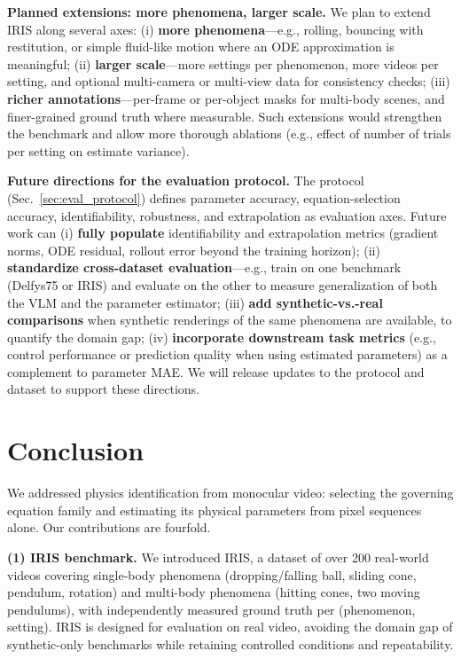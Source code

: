 \textbf{Planned extensions: more phenomena, larger scale.} We plan to extend IRIS along several axes: (i) \textbf{more phenomena}—e.g., rolling, bouncing with restitution, or simple fluid-like motion where an ODE approximation is meaningful; (ii) \textbf{larger scale}—more settings per phenomenon, more videos per setting, and optional multi-camera or multi-view data for consistency checks; (iii) \textbf{richer annotations}—per-frame or per-object masks for multi-body scenes, and finer-grained ground truth where measurable. Such extensions would strengthen the benchmark and allow more thorough ablations (e.g., effect of number of trials per setting on estimate variance).

\textbf{Future directions for the evaluation protocol.} The protocol (Sec.~\ref{sec:eval_protocol}) defines parameter accuracy, equation-selection accuracy, identifiability, robustness, and extrapolation as evaluation axes. Future work can (i) \textbf{fully populate} identifiability and extrapolation metrics (gradient norms, ODE residual, rollout error beyond the training horizon); (ii) \textbf{standardize cross-dataset evaluation}—e.g., train on one benchmark (Delfys75 or IRIS) and evaluate on the other to measure generalization of both the VLM and the parameter estimator; (iii) \textbf{add synthetic-vs.-real comparisons} when synthetic renderings of the same phenomena are available, to quantify the domain gap; (iv) \textbf{incorporate downstream task metrics} (e.g., control performance or prediction quality when using estimated parameters) as a complement to parameter MAE. We will release updates to the protocol and dataset to support these directions.


\section{Conclusion}
\label{sec:conclusion}

We addressed physics identification from monocular video: selecting the governing equation family and estimating its physical parameters from pixel sequences alone. Our contributions are fourfold.

\textbf{(1) IRIS benchmark.} We introduced IRIS, a dataset of over 200 real-world videos covering single-body phenomena (dropping/falling ball, sliding cone, pendulum, rotation) and multi-body phenomena (hitting cones, two moving pendulums), with independently measured ground truth per (phenomenon, setting). IRIS is designed for evaluation on real video, avoiding the domain gap of synthetic-only benchmarks while retaining controlled conditions and repeatability.

